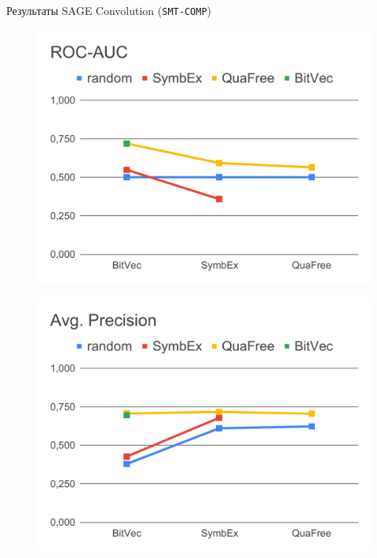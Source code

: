 \documentclass[14pt,aspectratio=169,hyperref={pdftex,unicode},xcolor=dvipsnames]{beamer}
\begin{document}
\begin{frame}{Результаты SAGE Convolution (\texttt{SMT-COMP})}

\begin{minipage}{0.5\textwidth}

\begin{figure}[ht]
\begin{center}
  \includegraphics[scale=0.33]{./assets/smt-comp-roc-auc.pdf}
\end{center}
\end{figure}

\end{minipage}%
\begin{minipage}{0.5\textwidth}

\begin{figure}[ht]
\begin{center}
  \includegraphics[scale=0.33]{./assets/smt-comp-ap.pdf}
\end{center}
\end{figure}

\end{minipage}
  
\end{frame}
\end{document}
